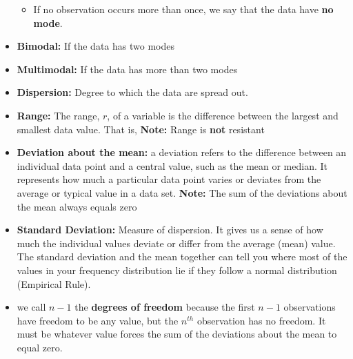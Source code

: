 \documentclass{report}
\begin{document}
\begin{itemize}
                \begin{itemize}
                    \item If no observation occurs more than once, we say that the data have \textbf{no mode}.
                \end{itemize}
            \item \textbf{Bimodal:} If the data has two modes
            \item \textbf{Multimodal:} If the data has more than two modes
            \item \textbf{Dispersion:} Degree to which the data are spread out. 
            \item \textbf{Range:} The range, $r $, of a variable is the difference between the largest and smallest data value. That is,
                \textbf{Note:} Range is \textbf{not} resistant
            \item \textbf{Deviation about the mean:} a deviation refers to the difference between an individual data point and a central value, such as the mean or median. It represents how much a particular data point varies or deviates from the average or typical value in a data set. 
                \bigbreak \noindent 
                \textbf{Note:} The sum of the deviations about the mean always equals zero
              \item \textbf{Standard Deviation:} Measure of dispersion. It gives us a sense of how much the individual values deviate or differ from the average (mean) value. The standard deviation and the mean together can tell you where most of the values in your frequency distribution lie if they follow a normal distribution (Empirical Rule).
            \item  we call $n-1$ the \textbf{degrees of freedom} because the first $n-1 $  observations have freedom to be any value, but the $n^{th}$ observation has no freedom. It must be whatever value forces the sum of the deviations about the mean to equal zero.

\end{itemize}
\end{document}
